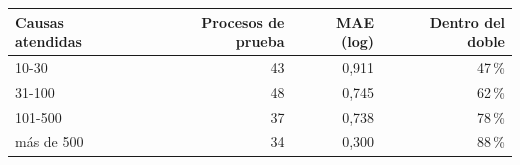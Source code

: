 \begin{tabular}{lrrr}
\toprule
Causas atendidas & Procesos de prueba & MAE (log) & Dentro del doble \\
\midrule
10-30 & 43 & 0,911 & 47\,\% \\
31-100 & 48 & 0,745 & 62\,\% \\
101-500 & 37 & 0,738 & 78\,\% \\
más de 500 & 34 & 0,300 & 88\,\% \\
\bottomrule
\end{tabular}
